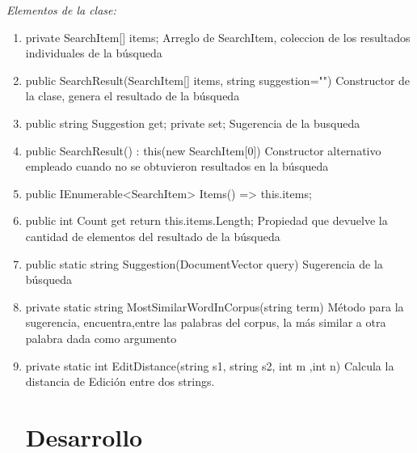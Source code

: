 \documentclass[a4paper,12pt,twocolumn]{article}
\begin{document}
\emph{Elementos de la clase:}
\begin{enumerate}
    \item private SearchItem[] items;
    Arreglo de SearchItem, coleccion de los resultados individuales de la búsqueda
    \item public SearchResult(SearchItem[] items, string suggestion="")
    Constructor de la clase, genera el resultado de la búsqueda
    \item public string Suggestion { get; private set; }
    Sugerencia de la busqueda
    \item public SearchResult() : this(new SearchItem[0]) {}
    Constructor alternativo empleado cuando no se obtuvieron resultados en la búsqueda
    \item public IEnumerable<SearchItem> Items() => this.items;
    \item public int Count { get { return this.items.Length; } }
    Propiedad que devuelve la cantidad de elementos del resultado de la búsqueda
    \item public static string Suggestion(DocumentVector query)
    Sugerencia de la búsqueda
    \item private static string MostSimilarWordInCorpus(string term)
    Método para la sugerencia, encuentra,entre las palabras del corpus, la más similar 
    a otra palabra dada como argumento
    \item private static int EditDistance(string s1, string s2, int m ,int n)
    Calcula la distancia de Edición entre dos strings.

\section{Desarrollo}

\end{enumerate}
\end{document}
